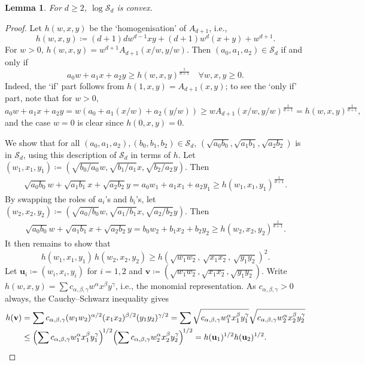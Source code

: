\documentclass{article}
\numberwithin{equation}{section}
\theoremstyle{plain}
\newtheorem{lemma}[theorem]{Lemma}
\theoremstyle{definition}
\theoremstyle{remark} %
\newcommand{\defeq}{\coloneqq}
\newcommand{\calS}{\mathcal{S}}
\begin{document}
\begin{lemma}\label{lem:Sd-log-convex}
    For \(d\ge2\), \(\log\calS_d\) is convex.
\end{lemma}
\begin{proof}
    Let $h(w,x,y)$ be the `homogenisation' of $A_{d+1}$, i.e.,
    \[
        h(w,x,y)\defeq (d+1)d w^{d-1}xy + (d+1) w^d(x+y) + w^{d+1}.
    \]
    For $w>0$, $h(w,x,y)= w^{d+1} A_{d+1}(x/w,y/w)$.
    Then \((a_0,a_1,a_2)\in\calS_d\) if and only if
    \[
        a_0 w + a_1 x + a_2 y \ge h(w,x,y)^{\frac{1}{d+1}}\quad \forall w,x,y\ge0.
    \]
    Indeed, the `if' part follows from \(h(1,x,y) = A_{d+1}(x,y)\); to see the `only if' part, note that for \(w>0\),
    \[
    	a_0w + a_1x + a_2y
    	= w (a_0 + a_1(x/w) + a_2(y/w))
    	\ge w A_{d+1}(x/w,y/w)^{\frac{1}{d+1}}
    	= h(w,x,y)^{\frac{1}{d+1}},
    \]
    and the case \(w=0\) is clear since \(h(0,x,y)=0\).

    We show that for all \((a_0,a_1,a_2),(b_0,b_1,b_2)\in \calS_d\), \((\sqrt{a_0b_0}, \sqrt{a_1b_1}, \sqrt{a_2b_2})\) is in \(\calS_d\), using this description of $\calS_d$ in terms of $h$.
    Let $(w_1,x_1,y_1)\defeq(\sqrt{b_0/a_0}w,\sqrt{b_1/a_1}x, \sqrt{b_2/a_2}y) $. Then
    \begin{align*}
        \sqrt{a_0b_0} w + \sqrt{a_1b_1} x + \sqrt{a_2b_2} y
        = a_0 w_1 + a_1x_1 + a_2 y_1 \ge h (w_1,x_1,y_1)^{\frac{1}{d+1}}.
    \end{align*}
    By swapping the roles of $a_i$'s and $b_i$'s, let $(w_2,x_2,y_2)\defeq(\sqrt{a_0/b_0}w,\sqrt{a_1/b_1}x, \sqrt{a_2/b_2}y)$. Then
    \begin{align*}
        \sqrt{a_0b_0} w + \sqrt{a_1b_1} x + \sqrt{a_2b_2} y= b_0 w_2 + b_1 x_2 + b_2 y_2
        \ge h(w_2,x_2,y_2)^{\frac{1}{d+1}}.
    \end{align*}
    It then remains to show that
    \[
        h(w_1,x_1,y_1)\, h(w_2,x_2,y_2)
        \ge h( \sqrt{w_1w_2},\, \sqrt{x_1x_2},\, \sqrt{y_1y_2} )^2.
    \]
    Let \(\mathbf{u}_i\defeq (w_i,x_i,y_i)\) for \(i=1,2\) and \(\mathbf{v}\defeq ( \sqrt{w_1w_2}, \sqrt{x_1x_2}, \sqrt{y_1y_2} )\).
    Write $h(w,x,y)=\sum  c_{\alpha,\beta,\gamma}w^{\alpha}x^{\beta}y^{\gamma}$, i.e., the monomial representation. As $c_{\alpha,\beta,\gamma}> 0$ always, the Cauchy--Schwarz inequality gives
    \begin{align*}
        h(\mathbf{v}) &= \sum c_{\alpha,\beta,\gamma}(w_1w_2)^{\alpha/2}(x_1x_2)^{\beta/2}(y_1y_2)^{\gamma/2} = \sum \sqrt{c_{\alpha,\beta,\gamma}w_1^\alpha x_1^\beta y_1^\gamma} \sqrt{c_{\alpha,\beta,\gamma}w_2^\alpha x_2^\beta y_2^\gamma}
      \\  &\leq \Bigl(\sum c_{\alpha,\beta,\gamma}w_1^\alpha x_1^\beta y_1^\gamma\Bigr)^{\!1/2}
      \Bigl(\sum c_{\alpha,\beta,\gamma}w_2^\alpha x_2^\beta y_2^\gamma\Bigr)^{\!1/2}
      = h(\mathbf{u}_1)^{1/2}h(\mathbf{u}_2)^{1/2}.\qedhere
    \end{align*}
\end{proof}
\end{document}
